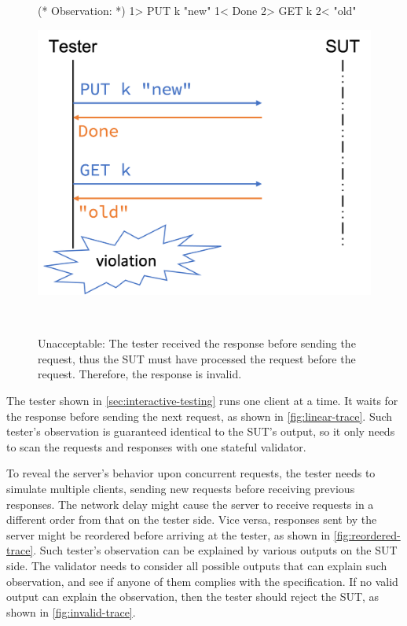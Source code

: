 \begin{figure}
  \centering
  \begin{minipage}[c]{.3\textwidth}
\begin{coq}
  (* Observation: *)
  1> PUT k "new"
  1< Done
  2> GET k
  2< "old"
\end{coq}
  \end{minipage}\begin{minipage}[c]{.4\textwidth}
  \includegraphics[width=\linewidth]{figures/invalid-trace}
  \end{minipage}\begin{minipage}[c]{.3\textwidth}\
  \end{minipage}
  \caption[Invalid trace that violates the specification.]{Unacceptable: The
    tester received the \ilc{Done} response before sending the 
    request, thus the SUT must have processed the \ilc{PUT} request before the
    \ilc{GET} request.  Therefore, the \ilc{"old"} response is invalid.}
  \label{fig:invalid-trace}
\end{figure}
The tester shown in \autoref{sec:interactive-testing} runs one client at a time.
It waits for the response before sending the next request, as shown in
\autoref{fig:linear-trace}.  Such tester's observation is guaranteed identical
to the SUT's output, so it only needs to scan the requests and responses with
one stateful validator.

To reveal the server's behavior upon concurrent requests, the tester needs to
simulate multiple clients, sending new requests before receiving previous
responses.  The network delay might cause the server to receive requests in a
different order from that on the tester side.  Vice versa, responses sent by the
server might be reordered before arriving at the tester, as shown in
\autoref{fig:reordered-trace}.  Such tester's observation can be explained by
various outputs on the SUT side.  The validator needs to consider all possible
outputs that can explain such observation, and see if anyone of them complies
with the specification.  If no valid output can explain the observation, then
the tester should reject the SUT, as shown in \autoref{fig:invalid-trace}.

